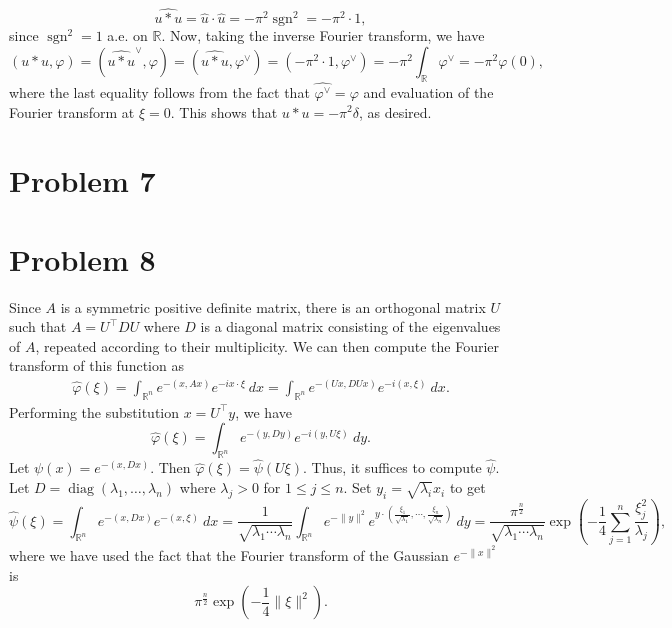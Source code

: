 \documentclass[10pt]{amsart}
\theoremstyle{thmstyle}
\theoremstyle{defstyle}
\newcommand{\R}{\mathbb{R}}
\newcommand{\sgn}{\operatorname{sgn}}
\newcommand{\wh}[1]{\widehat{#1}}
\renewcommand{\le}{\leqslant}
\begin{document}
\begin{equation*}
    \wh{u\ast u} = \wh u\cdot\wh u = -\pi^2\sgn^2 = -\pi^2\cdot 1,
\end{equation*}
since $\sgn^2 = 1$ a.e. on $\R$. Now, taking the inverse Fourier transform, we have 
\begin{equation*}
    (u\ast u, \varphi) = (\wh{u\ast u}^\vee,\varphi) = (\wh{u\ast u}, \varphi^\vee) = (-\pi^2\cdot 1, \varphi^\vee) = -\pi^2\int_{\R}\varphi^\vee = -\pi^2\varphi(0),
\end{equation*}
where the last equality follows from the fact that $\wh{\varphi^\vee} = \varphi$ and evaluation of the Fourier transform at $\xi = 0$. This shows that $u\ast u = -\pi^2\delta$, as desired.

\section{Problem 7}

\section{Problem 8}

Since $A$ is a symmetric positive definite matrix, there is an orthogonal matrix $U$ such that $A = U^\top D U$ where $D$ is a diagonal matrix consisting of the eigenvalues of $A$, repeated according to their multiplicity. We can then compute the Fourier transform of this function as 
\begin{align*}
    \wh\varphi(\xi) = \int_{\R^n} e^{-(x, Ax)}e^{-ix\cdot\xi}~dx = \int_{\R^n} e^{-(Ux, DUx)}e^{-i(x,\xi)}~dx.
\end{align*}
Performing the substitution $x = U^\top y$, we have 
\begin{equation*}
    \wh\varphi(\xi) = \int_{\R^n} e^{-(y, Dy)} e^{-i(y, U\xi)}~dy.
\end{equation*}
Let $\psi(x) = e^{-(x, Dx)}$. Then $\wh\varphi(\xi) = \wh\psi(U\xi)$. Thus, it suffices to compute $\wh\psi$. Let $D = \operatorname{diag}(\lambda_1,\dots,\lambda_n)$ where $\lambda_j > 0$ for $1\le j\le n$. Set $y_i = \sqrt{\lambda_i}x_i$ to get 
\begin{equation*}
    \wh\psi(\xi) = \int_{\R^n} e^{-(x, Dx)}e^{-(x, \xi)}~dx = \frac{1}{\sqrt{\lambda_1\cdots\lambda_n}}\int_{\R^n} e^{-\|y\|^2} e^{y\cdot\left(\frac{\xi_1}{\sqrt{\lambda_1}},\cdots,\frac{\xi_n}{\sqrt{\lambda_n}}\right)}~dy = \frac{\pi^{\frac{n}{2}}}{\sqrt{\lambda_1\cdots\lambda_n}}\exp\left(-\frac{1}{4}\sum_{j = 1}^n\frac{\xi_j^2}{\lambda_j}\right),
\end{equation*}
where we have used the fact that the Fourier transform of the Gaussian $e^{-\|x\|^2}$ is 
\begin{equation*}
    \pi^{\frac{n}{2}}\exp\left(-\frac{1}{4}\|\xi\|^2\right).
\end{equation*}
\end{document}
